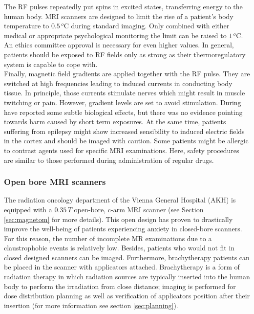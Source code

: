 
The RF pulses repeatedly put spins in excited states, transferring energy to the human body.
MRI scanners are designed to limit the rise of a patient's body temperature to $0.5\,^o$C during standard imaging.
Only combined with either medical or appropriate psychological monitoring the limit can be raised to $1\,^o$C.
An ethics committee approval is necessary for even higher values.
In general, patients should be exposed to RF fields only as strong as their thermoregulatory system is capable to cope with.\\

Finally, magnetic field gradients are applied together with the RF pulse.
They are switched at high frequencies leading to induced currents in conducting body tissue.
In principle, those currents stimulate nerves which might result in muscle twitching or pain.
However, gradient levels are set to avoid stimulation.
During have reported some subtle biological effects, but there was no evidence pointing towards harm caused by short term exposures.
At the same time, patients suffering from epilepsy might show increased sensibility to induced electric fields in the cortex and should be imaged with caution. \cite{Maidment2014}
Some patients might be allergic to contrast agents used for specific MRI examinations.
Here, safety procedures are similar to those performed during administration of regular drugs. 

\subsubsection{Open bore MRI scanners}

The radiation oncology department of the Vienna General Hospital (AKH) is equipped with a $0.35\, T$ open-bore, c-arm MRI scanner (see Section \ref{sec:magnetom} for more details).
This open design has proven to drastically improve the well-being of patients experiencing anxiety in closed-bore scanners.
For this reason, the number of incomplete MR examinations due to a claustrophobic events is relatively low. \cite{Enders2011, Bangard2007}
Besides, patients who would not fit in closed designed scanners can be imaged.
Furthermore, brachytherapy patients can be placed in the scanner with applicators attached.
Brachytherapy is a form of radiation therapy in which radiation sources are typically inserted into the human body to perform the irradiation from close distance; imaging is performed for dose distribution planning as well as verification of applicators position after their insertion (for more information see section \ref{sec:planning}).

